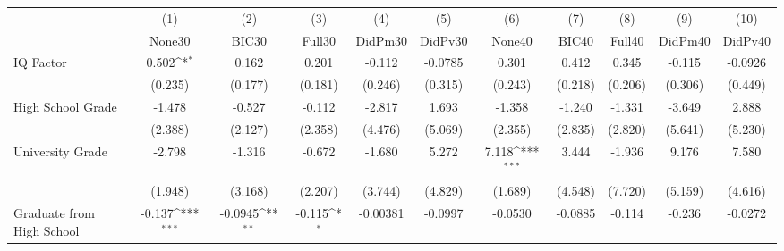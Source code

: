 {
\def\sym#1{\ifmmode^{#1}\else\(^{#1}\)\fi}
\begin{tabular}{l*{10}{c}}
\toprule
            &\multicolumn{1}{c}{(1)}&\multicolumn{1}{c}{(2)}&\multicolumn{1}{c}{(3)}&\multicolumn{1}{c}{(4)}&\multicolumn{1}{c}{(5)}&\multicolumn{1}{c}{(6)}&\multicolumn{1}{c}{(7)}&\multicolumn{1}{c}{(8)}&\multicolumn{1}{c}{(9)}&\multicolumn{1}{c}{(10)}\\
            &\multicolumn{1}{c}{None30}&\multicolumn{1}{c}{BIC30}&\multicolumn{1}{c}{Full30}&\multicolumn{1}{c}{DidPm30}&\multicolumn{1}{c}{DidPv30}&\multicolumn{1}{c}{None40}&\multicolumn{1}{c}{BIC40}&\multicolumn{1}{c}{Full40}&\multicolumn{1}{c}{DidPm40}&\multicolumn{1}{c}{DidPv40}\\
\midrule
IQ Factor   &       0.502\sym{*}  &       0.162         &       0.201         &      -0.112         &     -0.0785         &       0.301         &       0.412         &       0.345         &      -0.115         &     -0.0926         \\
            &     (0.235)         &     (0.177)         &     (0.181)         &     (0.246)         &     (0.315)         &     (0.243)         &     (0.218)         &     (0.206)         &     (0.306)         &     (0.449)         \\
\addlinespace
High School Grade&      -1.478         &      -0.527         &      -0.112         &      -2.817         &       1.693         &      -1.358         &      -1.240         &      -1.331         &      -3.649         &       2.888         \\
            &     (2.388)         &     (2.127)         &     (2.358)         &     (4.476)         &     (5.069)         &     (2.355)         &     (2.835)         &     (2.820)         &     (5.641)         &     (5.230)         \\
\addlinespace
University Grade&      -2.798         &      -1.316         &      -0.672         &      -1.680         &       5.272         &       7.118\sym{***}&       3.444         &      -1.936         &       9.176         &       7.580         \\
            &     (1.948)         &     (3.168)         &     (2.207)         &     (3.744)         &     (4.829)         &     (1.689)         &     (4.548)         &     (7.720)         &     (5.159)         &     (4.616)         \\
\addlinespace
Graduate from High School&      -0.137\sym{***}&     -0.0945\sym{**} &      -0.115\sym{*}  &    -0.00381         &     -0.0997         &     -0.0530         &     -0.0885         &      -0.114         &      -0.236         &     -0.0272         \\

\end{tabular}}
